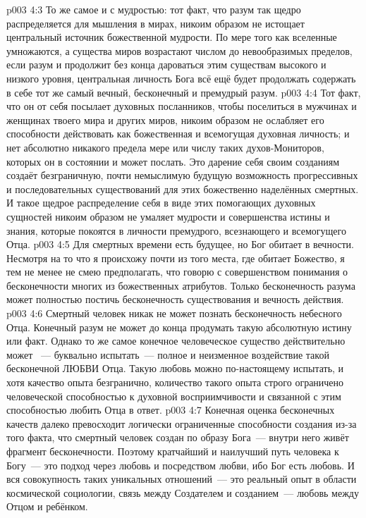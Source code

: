 \vs p003 4:3 То же самое и с мудростью: тот факт, что разум так щедро распределяется для мышления в мирах, никоим образом не истощает центральный источник божественной мудрости. По мере того как вселенные умножаются, а существа миров возрастают числом до невообразимых пределов, если разум и продолжит без конца дароваться этим существам высокого и низкого уровня, центральная личность Бога всё ещё будет продолжать содержать в себе тот же самый вечный, бесконечный и премудрый разум.
\vs p003 4:4 Тот факт, что он от себя посылает духовных посланников, чтобы поселиться в мужчинах и женщинах твоего мира и других миров, никоим образом не ослабляет его способности действовать как божественная и всемогущая духовная личность; и нет абсолютно никакого предела мере или числу таких духов\hyp{}Мониторов, которых он в состоянии и может послать. Это дарение себя своим созданиям создаёт безграничную, почти немыслимую будущую возможность прогрессивных и последовательных существований для этих божественно наделённых смертных. И такое щедрое распределение себя в виде этих помогающих духовных сущностей никоим образом не умаляет мудрости и совершенства истины и знания, которые покоятся в личности премудрого, всезнающего и всемогущего Отца.
\vs p003 4:5 \pc Для смертных времени есть будущее, но Бог обитает в вечности. Несмотря на то что я происхожу почти из того места, где обитает Божество, я тем не менее не смею предполагать, что говорю с совершенством понимания о бесконечности многих из божественных атрибутов. Только бесконечность разума может полностью постичь бесконечность существования и вечность действия.
\vs p003 4:6 \pc Смертный человек никак не может познать бесконечность небесного Отца. Конечный разум не может до конца продумать такую абсолютную истину или факт. Однако то же самое конечное человеческое существо действительно может ~--- буквально испытать~--- полное и неизменное воздействие такой бесконечной ЛЮБВИ Отца. Такую любовь можно по\hyp{}настоящему испытать, и хотя качество опыта безгранично, количество такого опыта строго ограничено человеческой способностью к духовной восприимчивости и связанной с этим способностью любить Отца в ответ.
\vs p003 4:7 Конечная оценка бесконечных качеств далеко превосходит логически ограниченные способности создания из\hyp{}за того факта, что смертный человек создан по образу Бога~--- внутри него живёт фрагмент бесконечности. Поэтому кратчайший и наилучший путь человека к Богу~--- это подход через любовь и посредством любви, ибо Бог есть любовь. И вся совокупность таких уникальных отношений~--- это реальный опыт в области космической социологии, связь между Создателем и созданием~--- любовь между Отцом и ребёнком.
